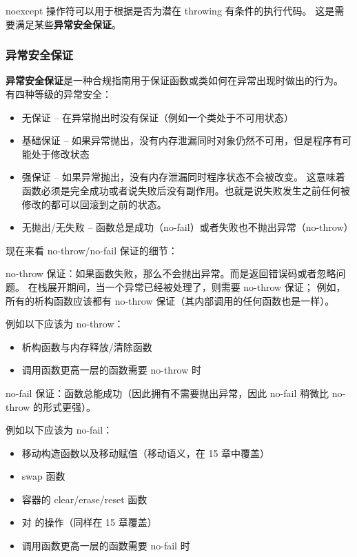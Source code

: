 \documentclass[../../LearnCpp.tex]{subfiles}
\begin{document}
noexcept 操作符可以用于根据是否为潜在 throwing 有条件的执行代码。
这是需要满足某些\textbf{异常安全保证}。

\subsubsection*{异常安全保证}

\textbf{异常安全保证}是一种合规指南用于保证函数或类如何在异常出现时做出的行为。
有四种等级的异常安全：

\begin{itemize}
  \item 无保证 -- 在异常抛出时没有保证（例如一个类处于不可用状态）
  \item 基础保证 -- 如果异常抛出，没有内存泄漏同时对象仍然不可用，但是程序有可能处于修改状态
  \item 强保证 -- 如果异常抛出，没有内存泄漏同时程序状态不会被改变。
        这意味着函数必须是完全成功或者说失败后没有副作用。也就是说失败发生之前任何被修改的都可以回滚到之前的状态。
  \item 无抛出/无失败 -- 函数总是成功（no-fail）或者失败也不抛出异常（no-throw）
\end{itemize}

现在来看 no-throw/no-fail 保证的细节：

no-throw 保证：如果函数失败，那么不会抛出异常。而是返回错误码或者忽略问题。
在栈展开期间，当一个异常已经被处理了，则需要 no-throw 保证；
例如，所有的析构函数应该都有 no-throw 保证（其内部调用的任何函数也是一样）。

例如以下应该为 no-throw：

\begin{itemize}
  \item 析构函数与内存释放/清除函数
  \item 调用函数更高一层的函数需要 no-throw 时
\end{itemize}

no-fail 保证：函数总能成功（因此拥有不需要抛出异常，因此 no-fail 稍微比 no-throw 的形式更强）。

例如以下应该为 no-fail：

\begin{itemize}
  \item 移动构造函数以及移动赋值（移动语义，在 15 章中覆盖）
  \item swap 函数
  \item 容器的 clear/erase/reset 函数
  \item 对  的操作（同样在 15 章覆盖）
  \item 调用函数更高一层的函数需要 no-fail 时
\end{itemize}
\end{document}
